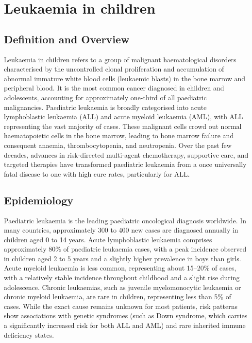 \chapter{Leukaemia in children}

\section*{Definition and Overview}
Leukaemia in children refers to a group of malignant haematological disorders characterised by the uncontrolled clonal proliferation and accumulation of abnormal immature white blood cells (leukaemic blasts) in the bone marrow and peripheral blood. It is the most common cancer diagnosed in children and adolescents, accounting for approximately one-third of all paediatric malignancies. Paediatric leukaemia is broadly categorised into acute lymphoblastic leukaemia (ALL) and acute myeloid leukaemia (AML), with ALL representing the vast majority of cases. These malignant cells crowd out normal haematopoietic cells in the bone marrow, leading to bone marrow failure and consequent anaemia, thrombocytopenia, and neutropenia. Over the past few decades, advances in risk-directed multi-agent chemotherapy, supportive care, and targeted therapies have transformed paediatric leukaemia from a once universally fatal disease to one with high cure rates, particularly for ALL.

\section*{Epidemiology}
Paediatric leukaemia is the leading paediatric oncological diagnosis worldwide. In many countries, approximately 300 to 400 new cases are diagnosed annually in children aged 0 to 14 years. Acute lymphoblastic leukaemia comprises approximately 80\% of paediatric leukaemia cases, with a peak incidence observed in children aged 2 to 5 years and a slightly higher prevalence in boys than girls. Acute myeloid leukaemia is less common, representing about 15--20\% of cases, with a relatively stable incidence throughout childhood and a slight rise during adolescence. Chronic leukaemias, such as juvenile myelomonocytic leukaemia or chronic myeloid leukaemia, are rare in children, representing less than 5\% of cases. While the exact cause remains unknown for most patients, risk patterns show associations with genetic syndromes (such as Down syndrome, which carries a significantly increased risk for both ALL and AML) and rare inherited immune deficiency states.

